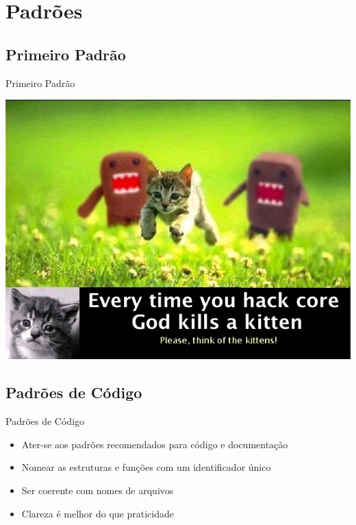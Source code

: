 \documentclass{beamer}
\begin{document}
\section{Padrões}

\begin{frame}\end{frame}

\subsection{Primeiro Padrão}

\begin{frame}{Primeiro Padrão}
  \begin{center}
    \includegraphics[height=0.8\textheight]{./img/hack-core.jpg}
  \end{center}
\end{frame}

\subsection{Padrões de Código}

\begin{frame}{Padrões de Código}
\begin{itemize}
  \pause \item Ater-se aos padrões recomendados para código e documentação
  \pause \item Nomear as estruturas e funções com um identificador único
  \pause \item Ser coerente com nomes de arquivos
  \pause \item Clareza é melhor do que praticidade
\end{itemize}
\end{frame}
\end{document}
